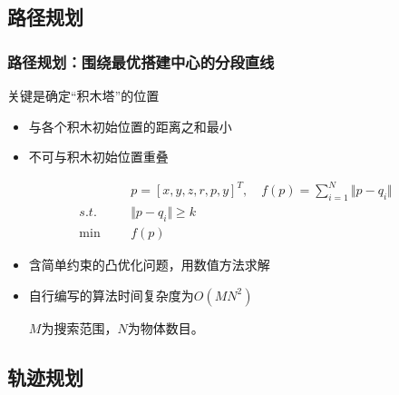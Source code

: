 \documentclass{beamer}
\begin{document}

\subsection{路径规划}

\begin{frame}
    \frametitle{路径规划：围绕最优搭建中心的分段直线}
    关键是确定“积木塔”的位置
    \begin{itemize}
        \item 与各个积木初始位置的距离之和最小
        \item 不可与积木初始位置重叠
    \end{itemize}
    \[
        \begin{aligned}
                 &  &  & p=[x,y,z,r,p,y]^T,\quad f(p) = \sum_{i=1}^N \Vert p-q_i \Vert \\
            s.t. &  &  & \Vert p-q_i \Vert \geq k                                      \\
            \min &  &  & f(p)
        \end{aligned}
    \]
    \begin{itemize}
        \item 含简单约束的凸优化问题，用数值方法求解
        \item 自行编写的算法时间复杂度为\(O(MN^2)\) \par \(M\)为搜索范围，\(N\)为物体数目。
    \end{itemize}
\end{frame}


\subsection{轨迹规划}
\end{document}
